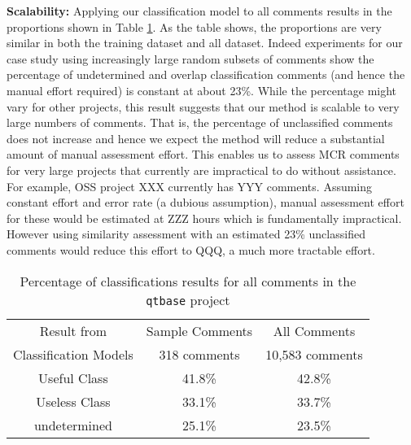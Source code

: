 


\textbf{Scalability:} Applying our classification model to all comments results in the proportions shown in Table \ref{tb:percent}.
As the table shows, the proportions are very similar in both the training dataset and all dataset. Indeed experiments for our case study using increasingly large random subsets of comments show the percentage of undetermined and overlap classification comments (and hence the manual effort required) is constant at about 23\%. While the percentage might vary for other projects, this result suggests that our method is scalable to very large numbers of comments. That is, the percentage of unclassified comments does not increase and hence we expect the method will reduce a substantial amount of manual assessment effort. This enables us to assess MCR comments for very large projects that currently are impractical to do without assistance. 
For example, OSS project XXX currently has YYY comments. Assuming constant effort and error rate (a dubious assumption), manual assessment effort for these would be estimated at ZZZ hours which is fundamentally impractical. However using similarity assessment with an estimated 23\% unclassified comments would reduce this effort to QQQ, a much more tractable effort.  

\begin{table}[!t]
\caption{Percentage of classifications results for all comments in the \texttt{qtbase} project }
\small
\centering
\def\arraystretch{1.2}
\begin{tabular}{c|c|c}
\hline

Result from & Sample Comments   &  All Comments \\ \cline{2-3}
Classification Models &  318 comments  & 10,583 comments \\ \hline \hline
Useful Class  & 41.8\% & 42.8\% \\
Useless Class   & 33.1\%  & 33.7\% \\
undetermined  & 25.1\% & 23.5\% \\ \hline
\end{tabular}
\label{tb:percent}
\end{table}




